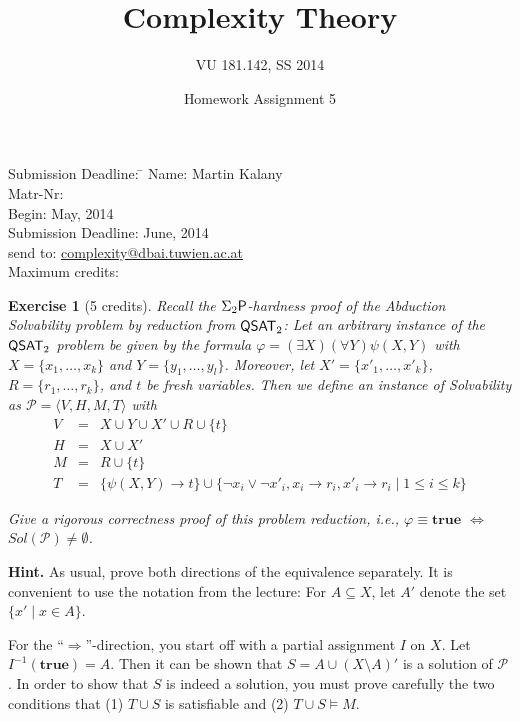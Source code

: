 \documentclass [11pt]{article}
\title{Complexity Theory}
\author{VU 181.142, SS 2014}
\date{Homework Assignment 5}
\newtheorem{exercise}{Exercise}
\newcommand{\ra}{\rightarrow}
\newcommand{\Ra}{\Rightarrow}
\newcommand{\LR}{\Leftrightarrow}
\renewcommand{\phi}{\varphi}
\newcommand{\ccfont}[1]{\protect\mathsf{#1}}
\newcommand{\Ptime}{\ccfont{P}}
\newcommand{\phs}[1]{\Sigma_{#1}\Ptime}
\newcommand{\QSAT}[1]{\ccfont{QSAT}_{#1}}
\newcommand{\True}{\mathbf{true}}
\begin{document}
\maketitle

\begin{tabbing}
Submission Deadline: \quad \= \kill
Name: \> Martin Kalany \\
Matr-Nr:  \\
Begin:  May, 2014  \\
Submission Deadline:  June, 2014  \\
send to: \> \url{complexity@dbai.tuwien.ac.at}\\
Maximum credits:  
\end{tabbing}


\medskip

\noindent
\begin{exercise}[5 credits]
{\em 
Recall the $\phs{2}$-hardness proof of the Abduction Solvability problem by reduction from $\QSAT{2}$:
Let an arbitrary instance of the $\QSAT{2}$ problem be given by the formula 
$\phi =  (\exists X) (\forall Y) \psi(X,Y)$
with $X = \{x_1, \dots, x_k \}$ and $Y = \{y_1, \dots, y_l\}$. Moreover, let 
$X' = \{x'_1, \dots, x'_k \}$, $R = \{r_1, \dots, r_k \}$, and $t$ be fresh variables. 
Then we define an instance of Solvability as
$\mathcal{P}=\langle V,H,M,T \rangle$ with
%
\begin{eqnarray*}
V &=& X \cup Y  \cup X' \cup R \cup \{t\}\\
H &=& X \cup X' \\
M &=& R \cup \{t\}\\
T &=& \{ \psi(X,Y)\ra t \} 
\cup \{\neg x_i \vee \neg x'_i, x_i \ra r_i, x'_i \ra r_i \mid 1 \leq i \leq k\} 
\end{eqnarray*}
%

\smallskip
\noindent
Give a rigorous correctness proof of this problem reduction, i.e., 
$\phi \equiv \True$ $\LR$ $Sol(\mathcal{P}) \neq \emptyset$.

}%
\end{exercise}

\noindent
{\bf Hint.} As usual, prove both directions of the equivalence separately. It is convenient to use the notation from the lecture: For 
$A \subseteq X$, let $A'$  denote
the set $\{x' \mid x \in A\}$.

For the ``$\Ra$''-direction, you start off with a partial assignment $I$ on $X$.
Let $I^{-1}(\True) = A$. Then it can be shown that $S = A \cup (X \setminus A)'$ 
is a solution of $\mathcal{P}$. In order to show that $S$ is indeed a solution, you must prove carefully the two conditions that (1) $T \cup S$ is satisfiable
and (2) $T \cup S \models M$. 
\end{document}
